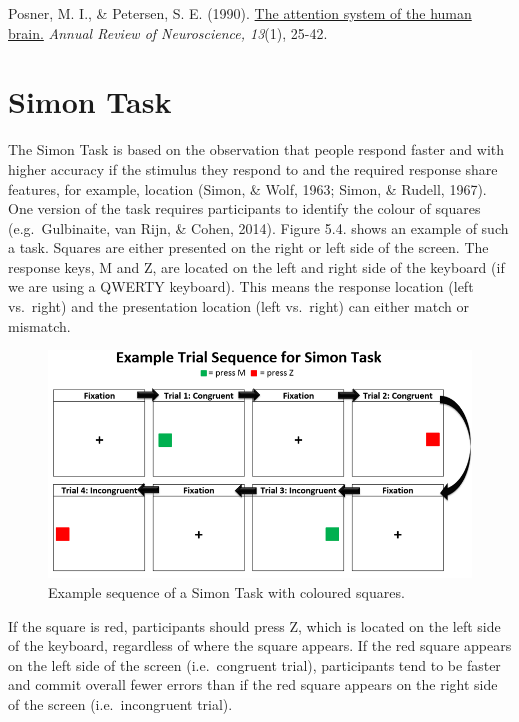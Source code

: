 \documentclass[
]{book}
\begin{document}
Posner, M. I., \& Petersen, S. E. (1990). \href{https://apps.dtic.mil/dtic/tr/fulltext/u2/a206157.pdf}{The attention system of the human brain.} \emph{Annual Review of Neuroscience, 13}(1), 25-42.

\hypertarget{simon-task}{%
\section{Simon Task}\label{simon-task}}

The Simon Task is based on the observation that people respond faster and with higher accuracy if the stimulus they respond to and the required response share features, for example, location (Simon, \& Wolf, 1963; Simon, \& Rudell, 1967). One version of the task requires participants to identify the colour of squares (e.g.~Gulbinaite, van Rijn, \& Cohen, 2014). Figure 5.4. shows an example of such a task. Squares are either presented on the right or left side of the screen. The response keys, M and Z, are located on the left and right side of the keyboard (if we are using a QWERTY keyboard). This means the response location (left vs.~right) and the presentation location (left vs.~right) can either match or mismatch.

\begin{figure}

{\centering \includegraphics[width=0.8\linewidth]{images/SimonTaskExample} 

}

\caption{Example sequence of a Simon Task with coloured squares.}\label{fig:Figure3-4}
\end{figure}

If the square is red, participants should press Z, which is located on the left side of the keyboard, regardless of where the square appears. If the red square appears on the left side of the screen (i.e.~congruent trial), participants tend to be faster and commit overall fewer errors than if the red square appears on the right side of the screen (i.e.~incongruent trial).
\end{document}
